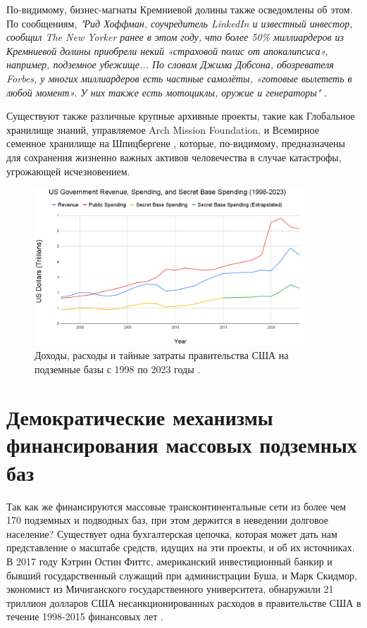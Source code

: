 \documentclass[10pt,twocolumn,letterpaper]{article}
\begin{document}
По-видимому, бизнес-магнаты Кремниевой долины также осведомлены об этом. По сообщениям, \textit{"Рид Хоффман, соучредитель LinkedIn и известный инвестор, сообщил The New Yorker ранее в этом году, что более 50\% миллиардеров из Кремниевой долины приобрели некий «страховой полис от апокалипсиса», например, подземное убежище... По словам Джима Добсона, обозревателя Forbes, у многих миллиардеров есть частные самолёты, «готовые вылететь в любой момент». У них также есть мотоциклы, оружие и генераторы"} \cite{28}.

Существуют также различные крупные архивные проекты, такие как Глобальное хранилище знаний, управляемое Arch Mission Foundation, \cite{29} и Всемирное семенное хранилище на Шпицбергене \cite{30}, которые, по-видимому, предназначены для сохранения жизненно важных активов человечества в случае катастрофы, угрожающей исчезновением.

\begin{figure}[t]
\begin{center}
\includegraphics[width=0.9\textwidth]{govcrop2.png}
\end{center}
   \caption{Доходы, расходы и тайные затраты правительства США на подземные базы с 1998 по 2023 годы \cite{19}.}
   \label{fig:9}
\end{figure}
\section{Демократические механизмы финансирования массовых подземных баз}

Так как же финансируются массовые трансконтинентальные сети из более чем 170 подземных и подводных баз, при этом держится в неведении долговое население? Существует одна бухгалтерская цепочка, которая может дать нам представление о масштабе средств, идущих на эти проекты, и об их источниках. В 2017 году Кэтрин Остин Фиттс, американский инвестиционный банкир и бывший государственный служащий при администрации Буша, и Марк Скидмор, экономист из Мичиганского государственного университета, обнаружили 21 триллион долларов США несанкционированных расходов в правительстве США в течение 1998-2015 финансовых лет \cite{11,12,13}.
\end{document}

